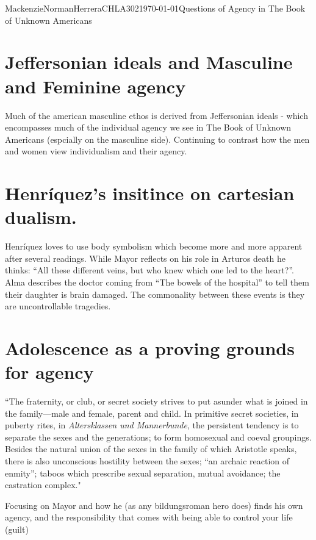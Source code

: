 \documentclass{article}
\begin{document}
\begin{mla}{Mackenzie}{Norman}{Herrera}{CHLA302}{\today}{Questions of Agency in The Book of Unknown Americans}
\section*{Jeffersonian ideals and Masculine and Feminine agency}
Much of the american masculine ethos is derived from Jeffersonian ideals - which encompasses much of the individual agency we see in The Book of Unknown Americans (espcially on the masculine side).  Continuing to contrast how the men and women view individualism and their agency.

\section*{Henríquez's insitince on cartesian dualism.}
Henríquez loves to use body symbolism which become more and more apparent after several readings. While Mayor reflects on his role in Arturos death he thinks: ``All these different veins, but who knew which one led to the heart?''. Alma describes the doctor coming from ``The bowels of the hospital'' to tell them their daughter is brain damaged. The commonality between these events is they are uncontrollable tragedies. 

\section*{Adolescence as a proving grounds for agency}
``The fraternity, or club, or secret society strives to put asunder what is joined in the family—male and female, parent and child. In primitive secret societies, in puberty rites, in \textit{Altersklassen und Mannerbunde}, the persistent tendency is to separate the sexes and the generations; to form homosexual and coeval groupings. Besides the natural union of the sexes in the family of which Aristotle speaks, there is also unconscious hostility between the sexes; ``an archaic reaction of enmity''; taboos which prescribe sexual separation, mutual avoidance; the castration complex."

Focusing on Mayor and how he (as any bildungsroman hero does) finds his own agency, and the responsibility that comes with being able to control your life (guilt)






\printbibliography

\end{mla}
\end{document}
